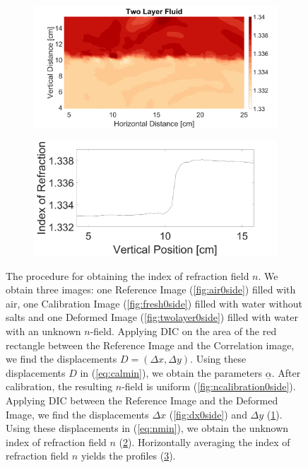 \documentclass{svjour3}                     %
\begin{document}
\begin{figure}[htbp]
\begin{subfigure}{.5\linewidth}
		\label{fig:dy0side}
\end{subfigure}\\
\begin{subfigure}{.5\linewidth}
		\centering \includegraphics[width = \textwidth]{TwoLayernSurf}
		\label{fig:ndeformed0side}
\end{subfigure}%
\begin{subfigure}{.5\linewidth}
	\centering \includegraphics[width = \textwidth]{TwoLayerHorizontalAveraged}
		\label{fig:nprofiles0side}
\end{subfigure}
\caption{The procedure for obtaining the index of refraction field $n$. We obtain three images: one Reference Image (\ref{fig:air0side}) filled with air, one Calibration Image (\ref{fig:fresh0side}) filled with water without salts and one Deformed Image (\ref{fig:twolayer0side}) filled with water with an unknown $n$-field. Applying DIC on the area of the red rectangle between the Reference Image and the Correlation image, we find the displacements $D=(\Delta x, \Delta y)$. Using these displacements $D$ in (\ref{eq:calmin}), we obtain the parameters $\underline{\alpha}$. After calibration, the resulting $n$-field is uniform (\ref{fig:ncalibration0side}). Applying DIC between the Reference Image and the Deformed Image, we find the displacements $\Delta x$ (\ref{fig:dx0side}) and $\Delta y$ (\ref{fig:dy0side}).  Using these displacements in (\ref{eq:nmin}), we obtain the unknown index of refraction field $n$ (\ref{fig:ndeformed0side}). Horizontally averaging the index of refraction field $n$ yields the profiles (\ref{fig:nprofiles0side}).}
\label{fig:0side}
\end{figure}
\end{document}
